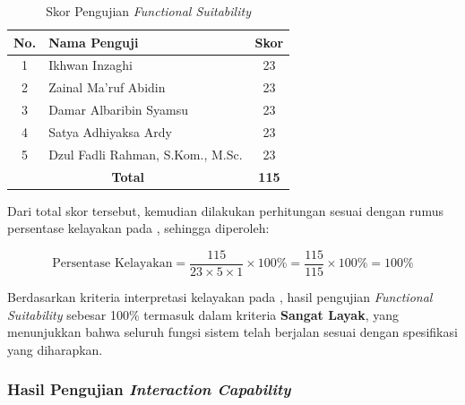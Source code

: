 \begin{table}[H]
      \centering
      \caption{Skor Pengujian \textit{Functional Suitability}}
      \label{tab:skor-functional-suitability}
      \begin{tabular}{|c|p{8cm}|c|}
            \hline
            \textbf{No.}                         & \textbf{Nama Penguji}            & \textbf{Skor} \\
            \hline
            1                                    & Ikhwan Inzaghi                   & 23            \\
            \hline
            2                                    & Zainal Ma'ruf Abidin             & 23            \\
            \hline
            3                                    & Damar Albaribin Syamsu           & 23            \\
            \hline
            4                                    & Satya Adhiyaksa Ardy             & 23            \\
            \hline
            5                                    & Dzul Fadli Rahman, S.Kom., M.Sc. & 23            \\
            \hline
            \multicolumn{2}{|c|}{\textbf{Total}} & \textbf{115}                                     \\
            \hline
      \end{tabular}
\end{table}

Dari total skor tersebut, kemudian dilakukan perhitungan sesuai dengan rumus persentase kelayakan pada , sehingga diperoleh:

\begin{equation}
      \text{Persentase Kelayakan} = \frac{115}{23 \times 5 \times 1} \times 100\% = \frac{115}{115} \times 100\% = 100\%
\end{equation}

Berdasarkan kriteria interpretasi kelayakan pada , hasil pengujian \textit{Functional Suitability} sebesar 100\% termasuk dalam kriteria \textbf{Sangat Layak}, yang menunjukkan bahwa seluruh fungsi sistem telah berjalan sesuai dengan spesifikasi yang diharapkan.

\subsubsection{Hasil Pengujian \textit{Interaction Capability}}

